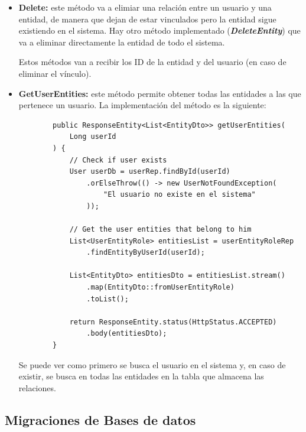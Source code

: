 \begin{itemize}
    En cuanto a la lógica de negocio implementada, lo que se hace es obtener el objeto que representa un valor en la relación (tabla que relaciona usuario con entidad) y modificar cada uno 
    de los valores según son pasados en el cuerpo de la petición, por ejemplo: si el rol es cambiado a \textit{admin}, solo se modifica el campo pasado.

    \item \textbf{Delete:} este método va a elimiar una relación entre un usuario y una entidad, de manera que dejan de estar vinculados pero la entidad sigue existiendo en el sistema.
    Hay otro método implementado (\textbf{\textit{DeleteEntity}}) que va a eliminar directamente la entidad de todo el sistema.

    Estos métodos van a recibir los ID de la entidad y del usuario (en caso de eliminar el vínculo).
    
    \item \textbf{GetUserEntities:} este método permite obtener todas las entidades a las que pertenece un usuario. La implementación del método es la siguiente:
    \begin{verbatim}
        public ResponseEntity<List<EntityDto>> getUserEntities(
            Long userId
        ) {
            // Check if user exists
            User userDb = userRep.findById(userId)
                .orElseThrow(() -> new UserNotFoundException(
                    "El usuario no existe en el sistema"
                ));

            // Get the user entities that belong to him
            List<UserEntityRole> entitiesList = userEntityRoleRep
                .findEntityByUserId(userId);

            List<EntityDto> entitiesDto = entitiesList.stream()
                .map(EntityDto::fromUserEntityRole)
                .toList();
            
            return ResponseEntity.status(HttpStatus.ACCEPTED)
                .body(entitiesDto);
        }
    \end{verbatim}

    Se puede ver como primero se busca el usuario en el sistema y, en caso de existir, se busca en todas las entidades en la tabla que almacena las relaciones.
\end{itemize}

\subsection{Migraciones de Bases de datos}

